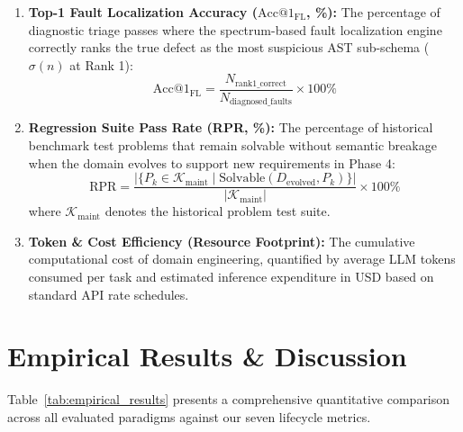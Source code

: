 \begin{enumerate}
    \item \textbf{Top-1 Fault Localization Accuracy ($\text{Acc}@1_{\text{FL}}$, \%):}
    The percentage of diagnostic triage passes where the spectrum-based fault localization engine correctly ranks the true defect as the most suspicious AST sub-schema ($\sigma(n)$ at Rank 1):
    \begin{equation}
        \text{Acc}@1_{\text{FL}} = \frac{N_{\text{rank1\_correct}}}{N_{\text{diagnosed\_faults}}} \times 100\%
    \end{equation}

    \item \textbf{Regression Suite Pass Rate (RPR, \%):}
    The percentage of historical benchmark test problems that remain solvable without semantic breakage when the domain evolves to support new requirements in Phase 4:
    \begin{equation}
        \text{RPR} = \frac{|\{ P_k \in \mathcal{K}_{\text{maint}} \mid \text{Solvable}(D_{\text{evolved}}, P_k) \}|}{|\mathcal{K}_{\text{maint}}|} \times 100\%
    \end{equation}
    where $\mathcal{K}_{\text{maint}}$ denotes the historical problem test suite.

    \item \textbf{Token \& Cost Efficiency (Resource Footprint):}
    The cumulative computational cost of domain engineering, quantified by average LLM tokens consumed per task and estimated inference expenditure in USD based on standard API rate schedules.
\end{enumerate}

\section{Empirical Results \& Discussion}
\label{sec:empirical_results}
Table~\ref{tab:empirical_results} presents a comprehensive quantitative comparison across all evaluated paradigms against our seven lifecycle metrics.

